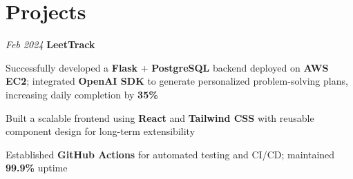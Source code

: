 \section{Projects}

\begin{twocolentry}{
    \textit{Feb 2024}
}{
    \textbf{LeetTrack} 
}
\end{twocolentry}
\begin{onecolentry}
    \begin{highlights}
        \item Successfully developed a \textbf{Flask} + \textbf{PostgreSQL} backend deployed on \textbf{AWS EC2}; integrated \textbf{OpenAI SDK} to generate personalized problem-solving plans, increasing daily completion by \textbf{35\%}
        \item Built a scalable frontend using \textbf{React} and \textbf{Tailwind CSS} with reusable component design for long-term extensibility
        \item Established \textbf{GitHub Actions} for automated testing and CI/CD; maintained \textbf{99.9\%} uptime 
    \end{highlights}
\end{onecolentry}
